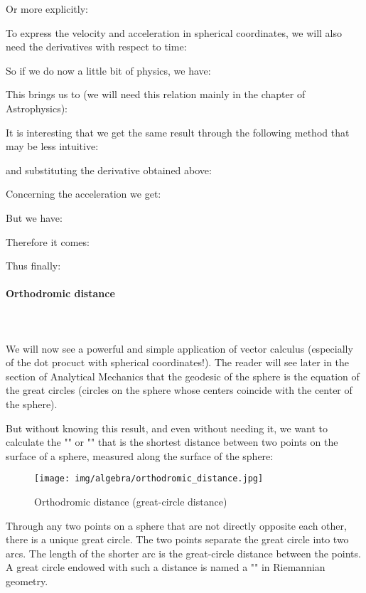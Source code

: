	Or more explicitly:
	
	To express the velocity and acceleration in spherical coordinates, we will also need the derivatives with respect to time:
	
	So if we do now a little bit of physics, we have:
	
	This brings us to (we will need this relation mainly in the chapter of Astrophysics):
	
	It is interesting that we get the same result through the following method that may be less intuitive:
	
	and substituting the derivative obtained above:
	
	Concerning the acceleration we get:
	
	But we have:
	
	Therefore it comes:
	

	Thus finally:
	
	
	\paragraph{Orthodromic distance}\mbox{}\\\\
	We will now see a powerful and simple application of vector calculus (especially of the dot procuct with spherical coordinates!). The reader will see later in the section of Analytical Mechanics that the geodesic of the sphere is the equation of the great circles (circles on the sphere whose centers coincide with the center of the sphere).

	But without knowing this result, and even without needing it, we want to calculate the "" or "" that is the shortest distance between two points on the surface of a sphere, measured along the surface of the sphere:
	\begin{figure}[H]
		\centering
		\texttt{[image: img/algebra/orthodromic\_distance.jpg]}
		\caption{Orthodromic distance (great-circle distance)}
	\end{figure}
	Through any two points on a sphere that are not directly opposite each other, there is a unique great circle. The two points separate the great circle into two arcs. The length of the shorter arc is the great-circle distance between the points. A great circle endowed with such a distance is named a "" in Riemannian geometry.
	
